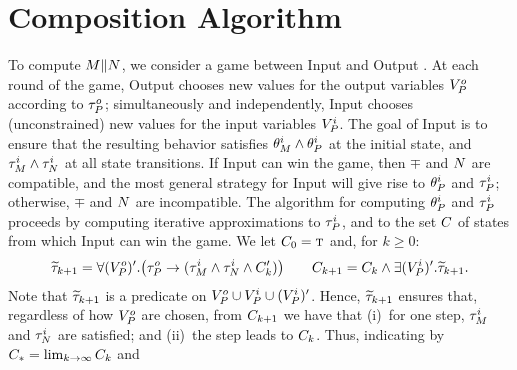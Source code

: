 \section{Composition Algorithm}
\label{sec:algo}
To compute $M \| N$, we consider a game between Input and
Output \cite{cav-paper}. At each round of the game, Output chooses
new values for the output variables ${ V}^o_P$ according to
$\tau^o_P$; simultaneously and independently, Input chooses
(unconstrained) new values for the input variables ${ V}^i_P$.
The goal of Input is to ensure that the resulting behavior
satisfies $\theta^i_M \wedge \theta^i_P$ at the initial state, and
$\tau^i_M \wedge \tau^i_N$ at all state transitions. If Input
can win the game, then $\mp$ and $N$ are compatible, and the
most general strategy for Input will give rise to $\theta^i_P$ and
$\tau^i_P$; otherwise, $\mp$ and $N$ are incompatible.
%
%
The algorithm for computing $\theta^i_P$ and $\tau^i_P$
proceeds by computing iterative approximations to $\tau^i_P$,
and to the set $C$ of states from which Input can win the
game. We let $C_0 = \mbox{\sc t}$ and, for $k \geq 0$:
%
\begin{equation}
  \label{eq-comp}
  \widetilde{\tau}_{k+1} = \forall ({ V}^o_P)' .
        \bigl(\tau^o_P \rightarrow (\tau^i_M \wedge \tau^i_N \wedge C'_k)\bigr)
  \hspace*{2em}
  C_{k+1} = C_k \wedge \exists ({ V}^i_P)' . \widetilde{\tau}_{k+1} .
\end{equation}
%
Note that $\widetilde{\tau}_{k+1}$ is a predicate on ${ V}^o_P \cup
{V}^i_P \cup ({ V}^i_P)'$. Hence, $\widetilde{\tau}_{k+1}$ ensures
that, regardless of how ${ V}^o_P$ are chosen, from
$C_{k+1}$ we have that (i)~for one step, $\tau^i_M$ and
$\tau^i_N$ are satisfied; and (ii)~the step leads to $C_k$.
Thus, indicating by $C_* = \lim_{k \rightarrow \infty} C_k$ and
